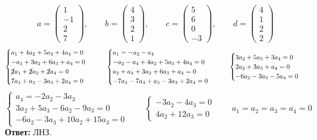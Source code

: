 $$ a =
\begin{pmatrix}
	1 \\
    -1 \\
    2 \\
    7
\end{pmatrix}, \qquad b =
\begin{pmatrix}
	4 \\
    3 \\
    2 \\
    1
\end{pmatrix}, \qquad c =
\begin{pmatrix}
	5 \\
    6 \\
    0 \\
    -3
\end{pmatrix}, \qquad d =
\begin{pmatrix}
	4 \\
    1 \\
    2 \\
    2
\end{pmatrix} $$
$$
\begin{cases}
	a_1 + 4a_2 + 5a_3 + 4a_4 = 0 \\
    -a_1 + 3a_2 + 6a_3 + a_4 = 0 \\
    \cancel2a_1 + \cancel2a_2 + \cancel2a_4 = 0 \\
    7a_1 + a_2 - 3a_3 + 2a_4 = 0
\end{cases} \qquad
\begin{cases}
	a_1 = -a_2 - a_4 \\
    -a_2 - a_4 + 4a_2 + 5a_3 + 4a_4 = 0 \\
    a_2 + a_4 + 3a_2 + 6a_3 + a_4 = 0 \\
    -7a_2 - 7a_4 + a_2 - 3a_3 + 2a_4 = 0
\end{cases} \qquad
\begin{cases}
	3a_2 + 5a_3 + 3a_4 = 0 \\
    2a_2 + 3a_3 + a_4 = 0 \\
    -6a_2 - 3a_3 - 5a_4 = 0
\end{cases} $$
$$
\begin{cases}
	a_4 = -2a_2 - 3a_3 \\
    3a_2 + 5a_3 - 6a_2 - 9a_3 = 0 \\
    -6a_2 - 3a_3 + 10a_2 + 15a_3 = 0
\end{cases} \qquad
\begin{cases}
	-3a_2 - 4a_3 = 0 \\
    4a_2 + 12a_3 = 0
\end{cases} \qquad a_1 = a_2 = a_3 = a_4 = 0 $$
\textbf{Ответ:} ЛНЗ.

